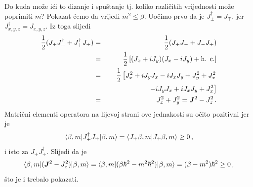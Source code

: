 Do kuda  može ići to dizanje i spuštanje tj. koliko različitih vrijednosti
može poprimiti $m$?
Pokazat ćemo da vrijedi $m^2 \leq \beta$.
Uočimo prvo da je $J_{\pm}^{\dagger}=J_{\mp}$, jer $J^{\dagger}_{x,y,z}=J_{x,y,z}$.
Iz toga slijedi
\begin{eqnarray*}
 \frac{1}{2}(J_+ J_{+}^{\dagger} + J_{+}^{\dagger}J_+)& = &
 \frac{1}{2}(J_+ J_{-}+ J_- J_+) \\
& = & \frac{1}{2} \left[ (J_x + i J_y)(J_x - i J_y) + \textrm{h. c.} \right]
\\ & = & \frac{1}{2} \left[ J_{x}^2 + i J_y J_x - i J_x J_y + J_{y}^2
  + J_{x}^2 \right. \\
   & & \qquad \qquad \qquad \left. - i J_y J_x + i J_x J_y + J_{x}^2 \right] \\
& = & J_{x}^2 + J_{y}^2 = \jsq - J_{z}^2 \,.
\end{eqnarray*}
Matrični elementi operatora na lijevoj strani ove jednakosti su očito
pozitivni jer je
\begin{displaymath}
\langle \beta, m |J_{+}^{\dagger}J_+ | \beta, m \rangle =
\langle J_{+}\beta, m |J_{+}\beta, m\rangle  \geq 0 \,,
\end{displaymath}
i isto za $J_+ J_{+}^{\dagger}$.
Slijedi da je
\begin{displaymath}
\bra{\beta, m}(\jsq - J_{z}^2)\ket{\beta, m}=
\bra{\beta, m}(\beta\hbar^2 - m^2\hbar^2)\ket{\beta, m} =
(\beta - m^2)\hbar^2 \geq 0 \,,
\end{displaymath}
što je i trebalo pokazati.

